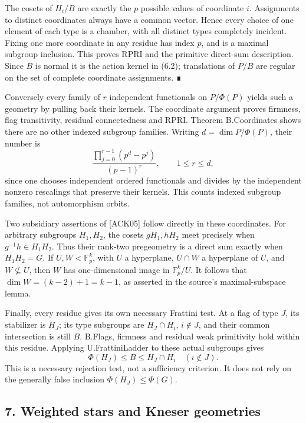 \documentclass[
  11pt,
  a4paper,
]{article}
\begin{document}
The cosets of \(H_i/B\) are exactly the \(p\) possible values of
coordinate \(i\). Assignments to distinct coordinates always have a
common vector. Hence every choice of one element of each type is a
chamber, with all distinct types completely incident. Fixing one more
coordinate in any residue has index \(p\), and is a maximal subgroup
inclusion. This proves RPRI and the primitive direct-sum description.
Since \(B\) is normal it is the action kernel in (6.2); translations of
\(P/B\) are regular on the set of complete coordinate assignments. ∎

Conversely every family of \(r\) independent functionals on
\(P/\Phi(P)\) yields such a geometry by pulling back their kernels. The
coordinate argument proves firmness, flag transitivity, residual
connectedness and RPRI. Theorem B.Coordinates shows there are no other
indexed subgroup families. Writing \(d=\dim P/\Phi(P)\), their number is
\[
\frac{\prod_{j=0}^{r-1}(p^d-p^j)}{(p-1)^r},\qquad 1\leq r\leq d,
\tag{6.4}
\] since one chooses independent ordered functionals and divides by the
independent nonzero rescalings that preserve their kernels. This counts
indexed subgroup families, not automorphism orbits.

Two subsidiary assertions of {[}ACK05{]} follow directly in these
coordinates. For arbitrary subgroups \(H_1,H_2\), the cosets
\(gH_1,hH_2\) meet precisely when \(g^{-1}h\in H_1H_2\). Thus their
rank-two pregeometry is a direct sum exactly when \(H_1H_2=G\). If
\(U,W<\mathbb F_p^k\), with \(U\) a hyperplane, \(U\cap W\) a hyperplane
of \(U\), and \(W\not\subseteq U\), then \(W\) has one-dimensional image
in \(\mathbb F_p^k/U\). It follows that \(\dim W=(k-2)+1=k-1\), as
asserted in the source's maximal-subspace lemma.

Finally, every residue gives its own necessary Frattini test. At a flag
of type \(J\), its stabilizer is \(H_J\); its type subgroups are
\(H_J\cap H_i\), \(i\notin J\), and their common intersection is still
\(B\). B.Flags, firmness and residual weak primitivity hold within this
residue. Applying U.FrattiniLadder to these actual subgroups gives \[
\Phi(H_J)\leq B\leq H_J\cap H_i\quad(i\notin J).
\tag{6.5}
\] This is a necessary rejection test, not a sufficiency criterion. It
does not rely on the generally false inclusion \(\Phi(H_J)\leq\Phi(G)\).

\subsection{7. Weighted stars and Kneser
geometries}\label{weighted-stars-and-kneser-geometries}
\end{document}
